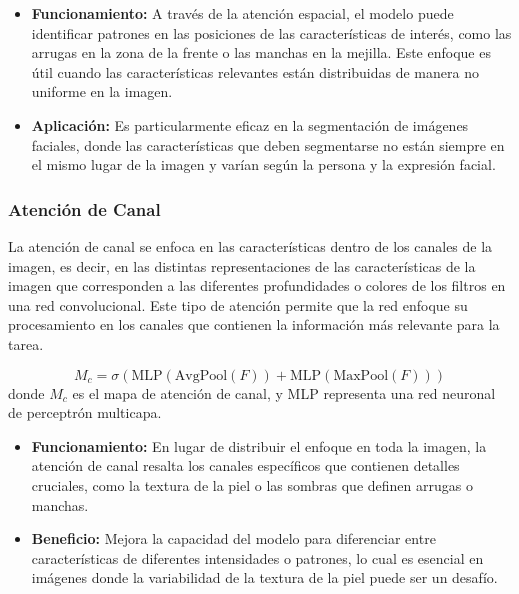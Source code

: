\begin{itemize}
    \item \textbf{Funcionamiento:} A través de la atención espacial, el modelo puede identificar patrones en las posiciones de las características de interés, como las arrugas en la zona de la frente o las manchas en la mejilla. Este enfoque es útil cuando las características relevantes están distribuidas de manera no uniforme en la imagen.
    \item \textbf{Aplicación:} Es particularmente eficaz en la segmentación de imágenes faciales, donde las características que deben segmentarse no están siempre en el mismo lugar de la imagen y varían según la persona y la expresión facial. \parencite{autor2020spa}
\end{itemize}

\subsubsection{Atención de Canal}  
La atención de canal se enfoca en las características dentro de los canales de la imagen, es decir, en las distintas representaciones de las características de la imagen que corresponden a las diferentes profundidades o colores de los filtros en una red convolucional. Este tipo de atención permite que la red enfoque su procesamiento en los canales que contienen la información más relevante para la tarea.  

\begin{equation}\label{eq:mapa_atencion_canal}
    M_c = \sigma(\text{MLP}(\text{AvgPool}(F)) + \text{MLP}(\text{MaxPool}(F)))
\end{equation}
donde $M_c$ es el mapa de atención de canal, y MLP representa una red neuronal de perceptrón multicapa.


\begin{itemize}
    \item \textbf{Funcionamiento:} En lugar de distribuir el enfoque en toda la imagen, la atención de canal resalta los canales específicos que contienen detalles cruciales, como la textura de la piel o las sombras que definen arrugas o manchas.
    \item \textbf{Beneficio:} Mejora la capacidad del modelo para diferenciar entre características de diferentes intensidades o patrones, lo cual es esencial en imágenes donde la variabilidad de la textura de la piel puede ser un desafío. \parencite{autor2019canal}
\end{itemize}

